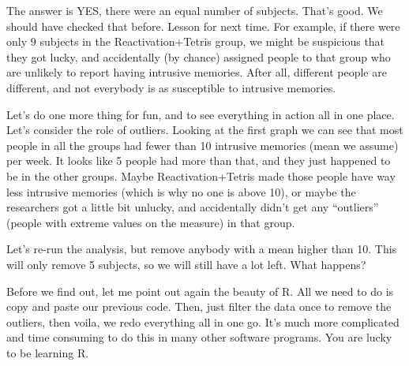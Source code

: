 \documentclass[]{book}
\begin{document}
The answer is YES, there were an equal number of subjects. That's good.
We should have checked that before. Lesson for next time. For example,
if there were only 9 subjects in the Reactivation+Tetris group, we might
be suspicious that they got lucky, and accidentally (by chance) assigned
people to that group who are unlikely to report having intrusive
memories. After all, different people are different, and not everybody
is as susceptible to intrusive memories.

Let's do one more thing for fun, and to see everything in action all in
one place. Let's consider the role of outliers. Looking at the first
graph we can see that most people in all the groups had fewer than 10
intrusive memories (mean we assume) per week. It looks like 5 people had
more than that, and they just happened to be in the other groups. Maybe
Reactivation+Tetris made those people have way less intrusive memories
(which is why no one is above 10), or maybe the researchers got a little
bit unlucky, and accidentally didn't get any ``outliers'' (people with
extreme values on the measure) in that group.

Let's re-run the analysis, but remove anybody with a mean higher than
10. This will only remove 5 subjects, so we will still have a lot left.
What happens?

Before we find out, let me point out again the beauty of R. All we need
to do is copy and paste our previous code. Then, just filter the data
once to remove the outliers, then voila, we redo everything all in one
go. It's much more complicated and time consuming to do this in many
other software programs. You are lucky to be learning R.
\end{document}
